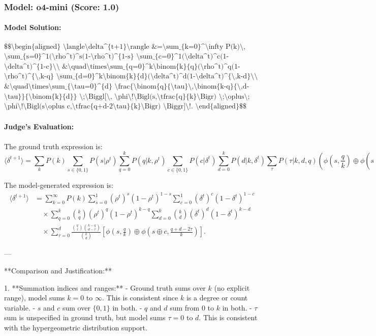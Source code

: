 \documentclass[10pt]{article}
\begin{document}
\subsubsection*{Model: o4-mini (Score: 1.0)}
\paragraph*{Model Solution:}
\[ \begin{aligned}
\langle\delta^{t+1}\rangle
&=\sum_{k=0}^\infty P(k)\,
  \sum_{s=0}^1(\rho^t)^s(1-\rho^t)^{1-s}
  \sum_{c=0}^1(\delta^t)^c(1-\delta^t)^{1-c}\\
&\quad\times\sum_{q=0}^k\binom{k}{q}(\rho^t)^q(1-\rho^t)^{\,k-q}
  \sum_{d=0}^k\binom{k}{d}(\delta^t)^d(1-\delta^t)^{\,k-d}\\
&\quad\times\sum_{\tau=0}^{d}
   \frac{\binom{q}{\tau}\,\binom{k-q}{\,d-\tau}}{\binom{k}{d}}
   \;\Biggl[\,
     \phi\!\Bigl(s,\tfrac{q}{k}\Bigr)
     \;\oplus\;
     \phi\!\Bigl(s\oplus c,\tfrac{q+d-2\tau}{k}\Bigr)
   \Biggr]\!.
\end{aligned} \]

\paragraph*{Judge's Evaluation:}

The ground truth expression is:
\[
\langle\delta^{t+1}\rangle = \sum_k P(k) \sum_{s \in \{0,1\}} P(s|\rho^t)
\sum_{q=0}^k P(q|k,\rho^t) \sum_{c \in \{0,1\}} P(c|\delta^t)
\sum_{d=0}^k P(d|k, \delta^t)
\sum_{\tau} P(\tau|k,d,q) \left( \phi\left(s, \frac{q}{k}\right) \oplus \phi\left(s \oplus c, \frac{q-2\tau+d}{k}\right) \right)
\]

The model-generated expression is:
\[
\begin{aligned}
\langle\delta^{t+1}\rangle
&= \sum_{k=0}^\infty P(k)
\sum_{s=0}^1 (\rho^t)^s (1-\rho^t)^{1-s}
\sum_{c=0}^1 (\delta^t)^c (1-\delta^t)^{1-c} \\
&\quad \times \sum_{q=0}^k \binom{k}{q} (\rho^t)^q (1-\rho^t)^{k-q}
\sum_{d=0}^k \binom{k}{d} (\delta^t)^d (1-\delta^t)^{k-d} \\
&\quad \times \sum_{\tau=0}^d \frac{\binom{q}{\tau} \binom{k-q}{d-\tau}}{\binom{k}{d}}
\left[
\phi\left(s, \frac{q}{k}\right) \oplus \phi\left(s \oplus c, \frac{q + d - 2\tau}{k}\right)
\right].
\end{aligned}
\]

---

**Comparison and Justification:**

1. **Summation indices and ranges:**
   - Ground truth sums over $k$ (no explicit range), model sums $k=0$ to $\infty$. This is consistent since $k$ is a degree or count variable.
   - $s$ and $c$ sum over $\{0,1\}$ in both.
   - $q$ and $d$ sum from $0$ to $k$ in both.
   - $\tau$ sum is unspecified in ground truth, but model sums $\tau=0$ to $d$. This is consistent with the hypergeometric distribution support.
\end{document}
